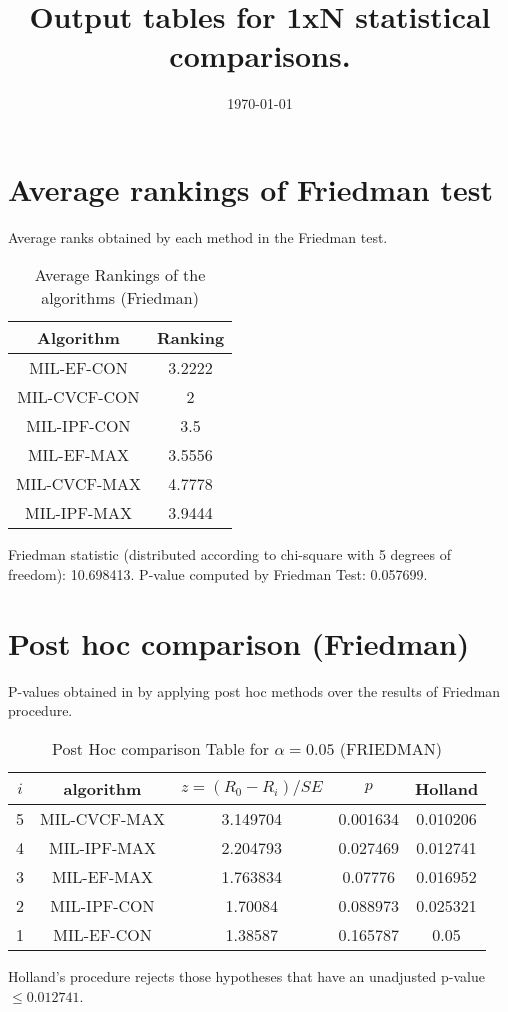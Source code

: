 \documentclass[a4paper,10pt]{article}
\title{Output tables for 1xN statistical comparisons.}
\author{}
\date{\today}
\begin{document}
\begin{landscape}
\pagestyle{empty}
\maketitle
\thispagestyle{empty}

\section{Average rankings of Friedman test}


Average ranks obtained by each method in the Friedman test.

\begin{table}[!htp]
\centering
\begin{tabular}{|c|c|}\hline
Algorithm&Ranking\\\hline
MIL-EF-CON&3.2222\\MIL-CVCF-CON&2\\MIL-IPF-CON&3.5\\MIL-EF-MAX&3.5556\\MIL-CVCF-MAX&4.7778\\MIL-IPF-MAX&3.9444\\\hline\end{tabular}
\caption{Average Rankings of the algorithms (Friedman)}
\end{table}

Friedman statistic (distributed according to chi-square with 5 degrees of freedom): 10.698413. \newline P-value computed by Friedman Test: 0.057699.\newline


\newpage

\section{Post hoc comparison (Friedman)}


P-values obtained in by applying post hoc methods over the results of Friedman procedure.

\begin{table}[!htp]
\centering\footnotesize
\begin{tabular}{ccccc}
$i$&algorithm&$z=(R_0 - R_i)/SE$&$p$&Holland\\
\hline5&MIL-CVCF-MAX&3.149704&0.001634&0.010206\\4&MIL-IPF-MAX&2.204793&0.027469&0.012741\\3&MIL-EF-MAX&1.763834&0.07776&0.016952\\2&MIL-IPF-CON&1.70084&0.088973&0.025321\\1&MIL-EF-CON&1.38587&0.165787&0.05\\\hline
\end{tabular}
\caption{Post Hoc comparison Table for $\alpha=0.05$ (FRIEDMAN)}
\end{table}Holland's procedure rejects those hypotheses that have an unadjusted p-value $\le0.012741$.



\end{landscape}
\end{document}
